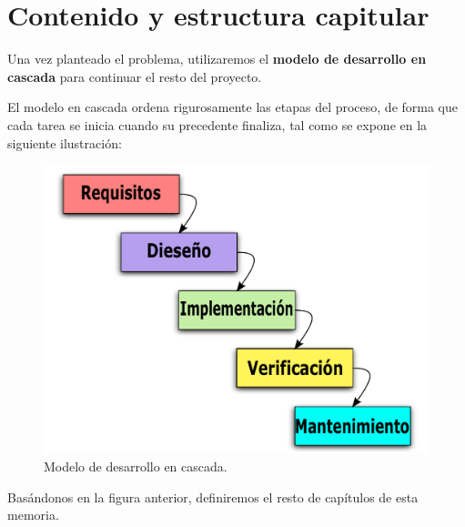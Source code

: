 \newpage

\section{Contenido y estructura capitular}

Una vez planteado el problema, utilizaremos el \textbf{modelo de desarrollo en cascada} para continuar el resto del proyecto.

El modelo en cascada ordena rigurosamente las etapas del proceso, de forma que cada tarea se inicia cuando su precedente finaliza, tal como se expone en la siguiente ilustración:

\smallskip

\begin{figure}[H]
	\noindent \begin{centering}
		\includegraphics[width=\linewidth/2]{capitulo1/figura12}
		\par\end{centering}
	\smallskip
	\caption[Modelo de desarrollo en cascada.]{\label{fig:figura12} Modelo de desarrollo en cascada. \cite{wiki_cascada}}
\end{figure} 

\smallskip

Basándonos en la figura anterior, definiremos el resto de capítulos de esta memoria.

